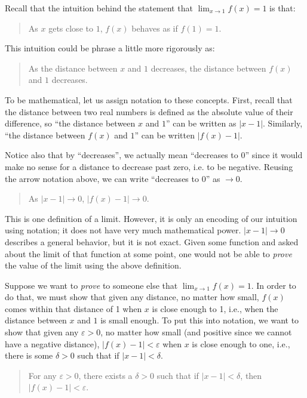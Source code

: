 Recall that the intuition behind the statement that $\lim_{x\to 1} f(x) = 1$ is that: 

\begin{quotation}
As $x$ gets close to $1$, $f(x)$ behaves as if $f(1) = 1$.
\end{quotation}

This intuition could be phrase a little more rigorously as:

\begin{quotation}
As the distance between $x$ and $1$ decreases, the distance between $f(x)$ and $1$ decreases.
\end{quotation}

To be mathematical, let us assign notation to these concepts. First, recall that the distance between two real numbers is defined as the absolute value of their difference, so ``the distance between $x$ and $1$'' can be written as $|x - 1|$. Similarly, ``the distance between $f(x)$ and $1$'' can be written $|f(x) - 1|$.

Notice also that by ``decreases'', we actually mean ``decreases to 0'' since it would make no sense for a distance to decrease past zero, i.e. to be negative. Reusing the arrow notation above, we can write ``decreases to 0'' as $\to 0$.

\begin{quotation}
As $|x - 1| \to 0$, $|f(x) - 1| \to 0$.
\end{quotation}

This is one definition of a limit. However, it is only an encoding of our intuition using notation; it does not have very much mathematical power. $|x - 1| \to 0$ describes a general behavior, but it is not exact. Given some function and asked about the limit of that function at some point, one would not be able to \textit{prove} the value of the limit using the above definition.

Suppose we want to \textit{prove} to someone else that $\lim_{x \to 1} f(x) = 1$. In order to do that, we must show that given any distance, no matter how small, $f(x)$ comes within that distance of 1 when $x$ is close enough to 1, i.e., when the distance between $x$ and $1$ is small enough. To put this into notation, we want to show that given any $\varepsilon > 0$, no matter how small (and positive since we cannot have a negative distance), $|f(x) - 1| < \varepsilon$ when $x$ is close enough to one, i.e., there is some $\delta > 0$ such that if $|x - 1| < \delta$.

\begin{quotation}
For any $\varepsilon > 0$, there exists a $\delta > 0$ such that if $|x - 1| < \delta$, then $|f(x) - 1| < \varepsilon$.
\end{quotation}


